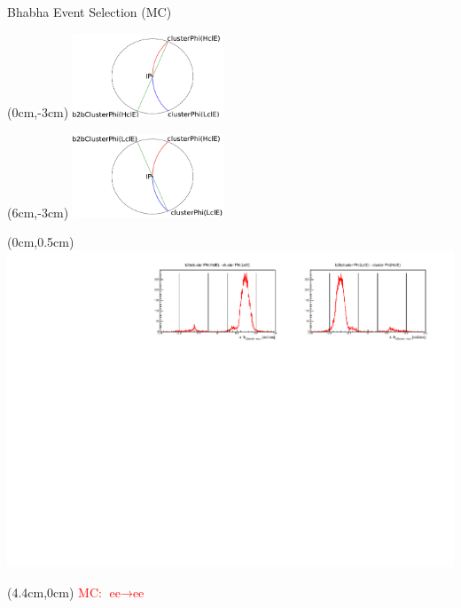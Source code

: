 \documentclass[8pt]{beamer}
\begin{document}
\begin{frame}{Bhabha Event Selection (MC)}	
	
		\begin{textblock*}{0.5\textwidth}(0cm,-3cm)
		\centering
		\includegraphics[width=4.5cm]{Plots/b2b_2}
	\end{textblock*}
	
	\begin{textblock*}{0.5\textwidth}(6cm,-3cm)
		\centering
		\includegraphics[width=4.5cm]{Plots/b2b_3}
	\end{textblock*}
	

		\begin{textblock*}{1\textwidth}(0cm,0.5cm)
		\centering
		\includegraphics[width=\textwidth]{Plots/Eff/b2b_MC.pdf}
	\end{textblock*}







	\begin{textblock*}{0.3\textwidth}(4.4cm,0cm)
		\textcolor{red}{MC: $\textrm{ee} \rightarrow \textrm{ee}$}
	\end{textblock*}





\end{frame}
\end{document}
